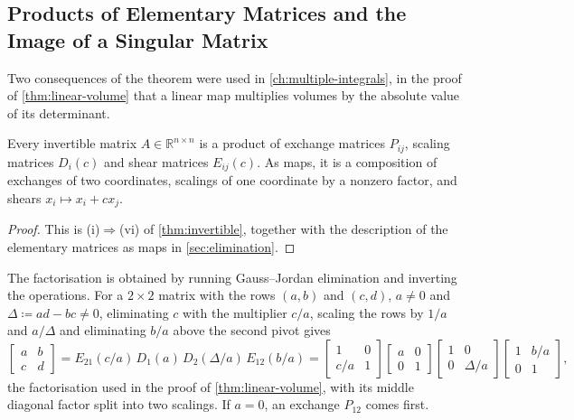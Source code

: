 \subsection{Products of Elementary Matrices and the Image of a Singular Matrix}

Two consequences of the theorem were used in \cref{ch:multiple-integrals}, in the proof of \cref{thm:linear-volume} that a linear map multiplies volumes by the absolute value of its determinant.

\begin{corollary}
\label{cor:elementary-product}
Every invertible matrix $A\in\mathbb R^{n\times n}$ is a product of exchange matrices $P_{ij}$, scaling matrices $D_i(c)$ and shear matrices $E_{ij}(c)$. As maps, it is a composition of exchanges of two coordinates, scalings of one coordinate by a nonzero factor, and shears $x_i\mapsto x_i+cx_j$.
\end{corollary}

\begin{proof}
This is (i)$\Rightarrow$(vi) of \cref{thm:invertible}, together with the description of the elementary matrices as maps in \cref{sec:elimination}.
\end{proof}

The factorisation is obtained by running Gauss--Jordan elimination and inverting the operations. For a $2\times2$ matrix with the rows $(a,b)$ and $(c,d)$, $a\ne0$ and $\Delta\coloneqq ad-bc\ne0$, eliminating $c$ with the multiplier $c/a$, scaling the rows by $1/a$ and $a/\Delta$ and eliminating $b/a$ above the second pivot gives
\[
\begin{bmatrix}a&b\\c&d\end{bmatrix}=E_{21}(c/a)\,D_1(a)\,D_2(\Delta/a)\,E_{12}(b/a)
=\begin{bmatrix}1&0\\c/a&1\end{bmatrix}\begin{bmatrix}a&0\\0&1\end{bmatrix}\begin{bmatrix}1&0\\0&\Delta/a\end{bmatrix}\begin{bmatrix}1&b/a\\0&1\end{bmatrix},
\]
the factorisation used in the proof of \cref{thm:linear-volume}, with its middle diagonal factor split into two scalings. If $a=0$, an exchange $P_{12}$ comes first.

